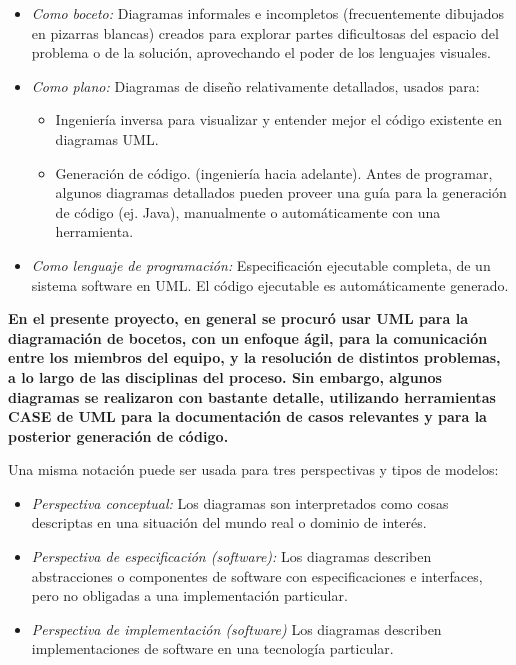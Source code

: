 \begin{itemize}
    \item \emph{Como boceto:} Diagramas  informales e incompletos (frecuentemente dibujados en pizarras blancas) creados para explorar partes dificultosas del espacio del problema o de la solución, aprovechando el poder de los lenguajes visuales.
    \item \emph{Como plano:} Diagramas de diseño relativamente detallados, usados para:
        \begin{itemize}
            \item Ingeniería inversa para visualizar y entender mejor el código existente en diagramas UML.
            \item Generación de código. (ingeniería hacia adelante). Antes de programar, algunos diagramas detallados pueden proveer una guía para la generación de código (ej. Java), manualmente o automáticamente con una herramienta. 
        \end{itemize}
    \item \emph{Como lenguaje de programación:} Especificación ejecutable completa, de un sistema software en UML. El código ejecutable es automáticamente generado.
\end{itemize}

\textbf{En el presente proyecto, en general se procuró usar UML para la diagramación de bocetos, con un enfoque ágil, para la comunicación entre los miembros del equipo, y la resolución de distintos problemas, a lo largo de las disciplinas del proceso.
Sin embargo, algunos diagramas se realizaron con bastante detalle, utilizando herramientas CASE de UML  para la documentación de casos relevantes y para la posterior generación de código.}

Una misma notación puede ser usada para tres perspectivas y tipos de modelos:

\begin{itemize}
    \item \emph{Perspectiva conceptual:} Los diagramas son interpretados como cosas descriptas en una situación del mundo real o dominio de interés.
    \item \emph{Perspectiva de especificación (software):} Los diagramas describen abstracciones o componentes de software con especificaciones e interfaces, pero no obligadas a una implementación particular.
    \item \emph{Perspectiva de implementación (software)} Los diagramas describen implementaciones de software en una tecnología particular.
\end{itemize}

